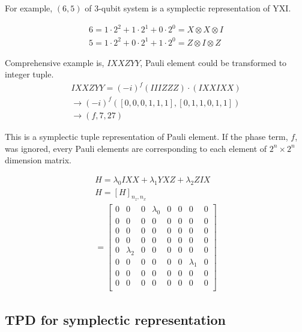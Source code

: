 \documentclass[twocolumn]{article}
\begin{document}
For example, $(6, 5)$ of 3-qubit system is a symplectic representation of $\text{YXI}$.

\begin{equation}
    \begin{array}{c}
        6 = 1 \cdot 2^2 +1 \cdot 2^1 + 0 \cdot 2^0 = X \otimes X \otimes I\\
        5 = 1 \cdot 2^2 +0 \cdot 2^1 + 1 \cdot 2^0 = Z \otimes I \otimes Z
    \end{array}
\end{equation}

Comprehensive example is, $IXXZYY$, Pauli element could be transformed to integer tuple.
\begin{align}
    IXXZYY = (-i)^f (IIIZZZ) \cdot (IXXIXX)\\
    \rightarrow (-i)^f ([0,0,0,1,1,1], [0,1,1,0,1,1]) \\
    \rightarrow (f, 7, 27)
\end{align}

This is a symplectic tuple representation of Pauli element.
If the phase term, $f$, was ignored, every Pauli elements are corresponding to 
each element of $2^n \times 2^n$ dimension matrix.


\begin{align}
    H = \lambda_0 IXX + \lambda_1 YXZ + \lambda_2 ZIX\\
    H = [H]_{n_z, n_x} \\
    = \begin{bmatrix}
        0 & 0 & 0& \lambda_0 & 0 & 0 & 0& 0\\
        0 & 0 & 0& 0 & 0 & 0 & 0& 0\\
        0 & 0 & 0& 0 & 0 & 0 & 0& 0\\
        0 & 0 & 0& 0 & 0 & 0 & 0& 0\\
        0 & \lambda_2 & 0& 0 & 0 & 0 & 0& 0\\
        0 & 0 & 0& 0 & 0 & 0 & \lambda_1& 0\\
        0 & 0 & 0& 0 & 0 & 0 & 0& 0\\
        0 & 0 & 0& 0 & 0 & 0 & 0& 0\\
    \end{bmatrix}\label{eq:canonical_sym}
\end{align}

\subsection{TPD for symplectic representation}
\end{document}
